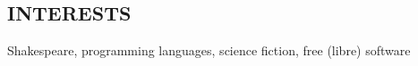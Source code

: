 \documentclass[centered, margin, 10pt]{res} %
\begin{document}
\begin{resume}

\section{INTERESTS}
Shakespeare, programming languages, science fiction, free (libre) software


\end{resume}
\end{document}
